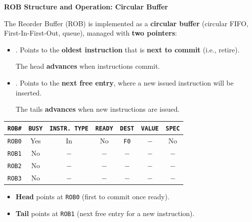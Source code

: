 \begin{flushleft}
    \textcolor{Green3}{ \textbf{ROB Structure and Operation: Circular Buffer}}
\end{flushleft}
The Reorder Buffer (ROB) is implemented as a \textbf{circular buffer} (circular FIFO, First-In-First-Out, queue), managed with \textbf{two pointers}:
\begin{itemize}
    \item {}. Points to the \textbf{oldest instruction} that is \textbf{next to commit} (i.e., retire).
    
    The head \textbf{advances} when instructions commit.

    \item {}. Points to the \textbf{next free entry}, where a new issued instruction will be inserted.
    
    The tails \textbf{advances} when new instructions are issued.
\end{itemize}

\begin{examplebox}
    \begin{center}
        \begin{tabular}{@{} c | c | c | c | c | c | c @{}}
            \toprule
            \texttt{ROB\#} & \texttt{BUSY} & \texttt{INSTR. TYPE} & \texttt{READY} & \texttt{DEST} & \texttt{VALUE} & \texttt{SPEC} \\
            \midrule
            \texttt{ROB0} & Yes  & In           & No    & \texttt{F0}   & $-$     & No   \\ [.3em]
            \texttt{ROB1} & No   & $-$            & $-$     & $-$    & $-$     & $-$   \\ [.3em]
            \texttt{ROB2} & No   & $-$            & $-$     & $-$    & $-$     & $-$   \\ [.3em]
            \texttt{ROB3} & No   & $-$            & $-$     & $-$    & $-$     & $-$   \\
            \bottomrule
        \end{tabular}
    \end{center}

    \begin{itemize}
        \item \textbf{Head} points at \texttt{ROB0} (first to commit once ready).
        \item \textbf{Tail} points at \texttt{ROB1} (next free entry for a new instruction).
    \end{itemize}
\end{examplebox}

